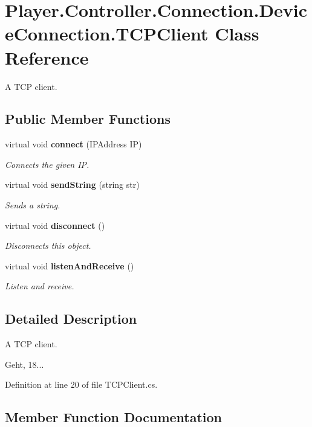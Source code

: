 \section{Player.\-Controller.\-Connection.\-Device\-Connection.\-T\-C\-P\-Client Class Reference}
\label{class_player_1_1_controller_1_1_connection_1_1_device_connection_1_1_t_c_p_client}


A T\-C\-P client.  


\subsection*{Public Member Functions}
\begin{DoxyCompactItemize}
\item 
virtual void {\bf connect} (I\-P\-Address I\-P)
\begin{DoxyCompactList}\small\item\em Connects the given I\-P. \end{DoxyCompactList}\item 
virtual void {\bf send\-String} (string str)
\begin{DoxyCompactList}\small\item\em Sends a string. \end{DoxyCompactList}\item 
virtual void {\bf disconnect} ()
\begin{DoxyCompactList}\small\item\em Disconnects this object. \end{DoxyCompactList}\item 
virtual void {\bf listen\-And\-Receive} ()
\begin{DoxyCompactList}\small\item\em Listen and receive. \end{DoxyCompactList}\end{DoxyCompactItemize}


\subsection{Detailed Description}
A T\-C\-P client. 

Geht, 18... 

Definition at line 20 of file T\-C\-P\-Client.\-cs.



\subsection{Member Function Documentation}
